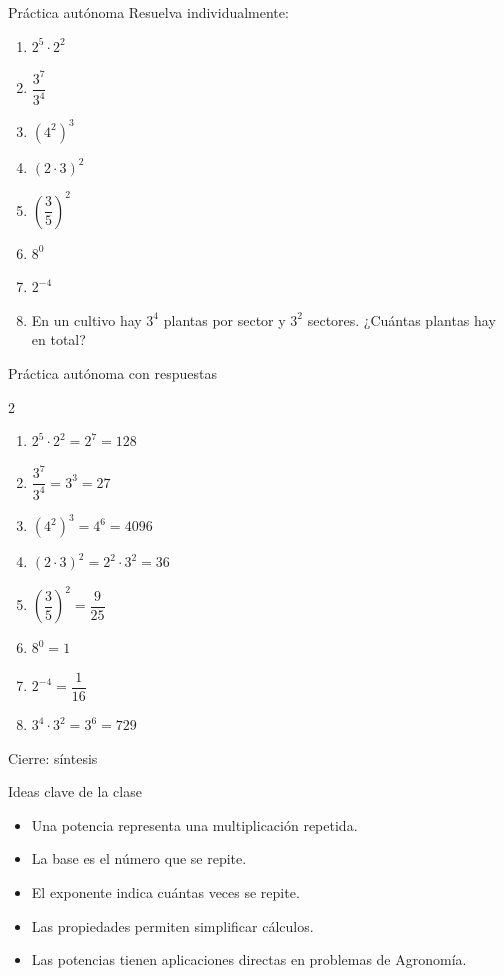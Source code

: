 \documentclass[aspectratio=169,10pt,handout]{beamer}
\begin{document}
	\begin{frame}{Práctica autónoma}
		Resuelva individualmente:
		\begin{enumerate}
			\item \(2^5\cdot2^2\)
			\item \(\dfrac{3^7}{3^4}\)
			\item \((4^2)^3\)
			\item \((2\cdot3)^2\)
			\item \(\left(\dfrac{3}{5}\right)^2\)
			\item \(8^0\)
			\item \(2^{-4}\)
			\item En un cultivo hay \(3^4\) plantas por sector y \(3^2\) sectores. ¿Cuántas plantas hay en total?
		\end{enumerate}
	\end{frame}
	
	\begin{frame}{Práctica autónoma con respuestas}
		\begin{multicols}{2}
			\begin{enumerate}
				\item \(2^5\cdot2^2=2^7=128\)
				\item \(\dfrac{3^7}{3^4}=3^3=27\)
				\item \((4^2)^3=4^6=4096\)
				\item \((2\cdot3)^2=2^2\cdot3^2=36\)
				\item \(\left(\dfrac{3}{5}\right)^2=\dfrac{9}{25}\)
				\item \(8^0=1\)
				\item \(2^{-4}=\dfrac{1}{16}\)
				\item \(3^4\cdot3^2=3^6=729\)
			\end{enumerate}
		\end{multicols}
	\end{frame}
	
	\begin{frame}{Cierre: síntesis}
		\begin{block}{Ideas clave de la clase}
			\begin{itemize}
				\item Una potencia representa una multiplicación repetida.
				\item La base es el número que se repite.
				\item El exponente indica cuántas veces se repite.
				\item Las propiedades permiten simplificar cálculos.
				\item Las potencias tienen aplicaciones directas en problemas de Agronomía.
			\end{itemize}
		\end{block}
	\end{frame}
	
\end{document}
